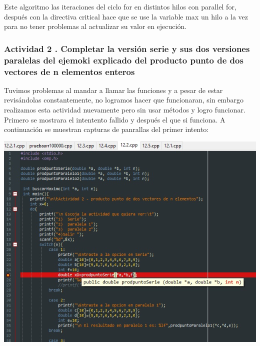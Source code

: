 \documentclass[12pt,letterpaper]{article}
\begin{document}
Este algoritmo las iteraciones del ciclo for en distintos hilos con parallel for, después con la directiva critical hace que se use la variable max un hilo a la vez para no tener problemas al actualizar su valor en ejecución.

\subsubsection*{Actividad 2 . Completar la versión serie y sus dos versiones paralelas del ejemoki explicado del producto punto de dos vectores de n elementos enteros}
Tuvimos problemas al mandar a llamar las funciones y a pesar de estar revisándolas constantemente, no logramos hacer que funcionaran, sin embargo realizamos esta actividad nuevamente pero sin usar métodos y logro funcionar. Primero  se mostrara el intentento fallido y después el que si funciona.
A continuación se muestran capturas de panrallas del primer intento:

\includegraphics[scale=.8]{13.jpg}
\end{document}
